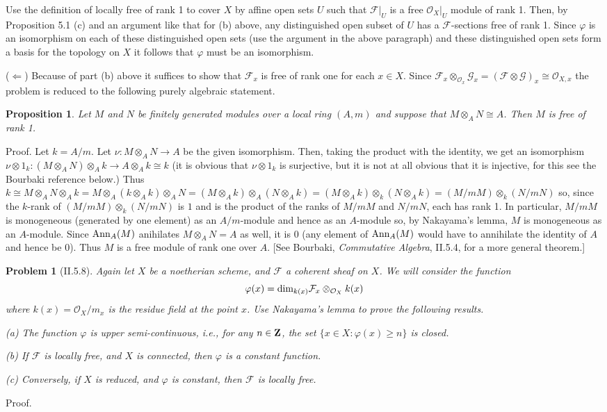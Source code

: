 \documentclass[12pt]{article}
\newcommand{\so}{\mathcal{O}}
\newcommand{\sox}{\mathcal{O}_X}
\renewcommand{\sf}{\mathcal{F}}
\newcommand{\sg}{\mathcal{G}}
\newcommand{\tensor}{\otimes}
\newcommand{\isom}{\cong}
\renewcommand{\dim}{\mbox{\rm dim}}
\newcommand{\z}{\mbox{\bfseries Z}}
\newcommand{\into}{\rightarrow}
\newcommand{\ru}{|_U}
\newcommand{\ann}{\mbox{\rm Ann}}
\newtheorem{prob}{Problem}
\newtheorem{prop}{Proposition}
\renewcommand{\phi}{\varphi}
\newcommand{\proof}{\mbox{\sc Proof.\hspace{.1in}}}
\begin{document}
Use the definition of locally free of rank 1 to cover 
$X$ by affine open sets $U$ such that $\sf\ru$ is
a free $\sox\ru$ module of rank 1. Then, by Proposition
5.1 (c) and an argument like that for (b) above, any
distinguished open subset of $U$ has a $\sf$-sections 
free of rank 1. Since $\phi$ is an isomorphism on each
of these distinguished open sets (use the argument in the
above paragraph) and these distinguished open sets form
a basis for the topology on $X$ it follows that $\phi$
must be an isomorphism. 

($\Longleftarrow$) Because of part (b) above it suffices
to show that $\sf_x$ is free of rank one for each $x\in X$. 
Since $\sf_x\tensor_{\so_x}\sg_x
=(\sf\tensor\sg)_x\isom\so_{X,x}$
the problem is reduced to the following purely
algebraic statement.

\begin{prop} Let $M$ and $N$ be finitely generated modules
over a local ring $(A,m)$ and suppose that 
$M\tensor_A N\isom A$. Then $M$ is free of rank 1.  
\end{prop}
\proof
Let $k=A/m$. Let $\nu:M\tensor_A N\into A$ be
the given isomorphism. Then, taking the product
with the identity, we get an isomorphism
$\nu\tensor 1_k:(M\tensor_A N)\tensor_A k\into 
A\tensor_A k\cong k$ (it is obvious that
$\nu\tensor 1_k$ is surjective, but it is 
not at all obvious that it is injective,
for this see the Bourbaki reference below.)
Thus $k\cong M\tensor_A N\tensor_A k
=M\tensor_A(k\tensor_A k)\tensor_A N
=(M\tensor_A k)\tensor_A(N\tensor_A k)
=(M\tensor_A k)\tensor_k(N\tensor_A k)
=(M/mM)\tensor_k (N/mN)$
so, since the $k$-rank of 
$(M/mM)\tensor_k (N/mN)$
is $1$ and is the product of
the ranks of $M/mM$ and $N/mN$, each has
rank 1. In particular, $M/mM$ is monogeneous (generated
by one element) as an $A/m$-module and hence as
an $A$-module so, 
by Nakayama's lemma, $M$ is monogeneous 
as an $A$-module. Since
$\ann_A(M)$ anihilates $M\tensor_A N=A$ as well,
it is $0$ (any element of $\ann_A(M)$ would have 
to annihilate the identity of $A$ and hence be $0$). 
Thus $M$ is a free module of rank one over $A$.  
[See Bourbaki, {\em Commutative Algebra}, II.5.4, for a
more general theorem.] 

\begin{prob}[II.5.8]
Again let $X$ be a noetherian scheme, and $\sf$ a coherent sheaf
on $X$. We will consider the function
$$\phi(x)=\dim_{k(x)}\sf_x\tensor_{\sox}k(x)$$
where $k(x)=\sox/m_x$ is the residue field at the point $x$. Use
Nakayama's lemma to prove the following results.

(a) The function $\phi$ is upper semi-continuous, i.e., for any 
$n\in \z$, the set $\{x\in X:\phi(x)\geq n\}$ is closed.

(b) If $\sf$ is locally free, and $X$ is connected, then
$\phi$ is a constant function. 

(c) Conversely, if $X$ is reduced, and $\phi$ is constant, 
then $\sf$ is locally free.
\end{prob} 
\proof
 
\end{document}
